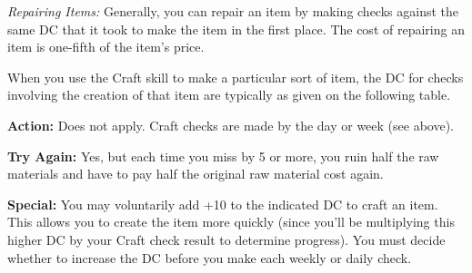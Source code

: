 \textit{Repairing Items:} Generally, you can repair an item by making checks against the same DC that it took to make the item in the first place. The cost of repairing an item is one-fifth of the item's price.

When you use the Craft skill to make a particular sort of item, the DC for checks involving the creation of that item are typically as given on the following table.


\textbf{Action:} Does not apply. Craft checks are made by the day or week (see above).

\textbf{Try Again:} Yes, but each time you miss by 5 or more, you ruin half the raw materials and have to pay half the original raw material cost again.

\textbf{Special:} You may voluntarily add +10 to the indicated DC to craft an item. This allows you to create the item more quickly (since you'll be multiplying this higher DC by your Craft check result to determine progress). You must decide whether to increase the DC before you make each weekly or daily check.


